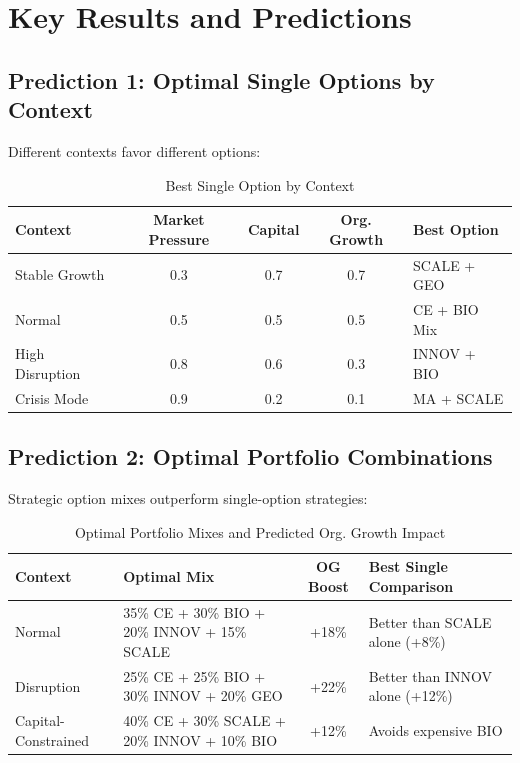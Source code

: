 \section{Key Results and Predictions}
\label{sec:socm-results}

\subsection{Prediction 1: Optimal Single Options by Context}

Different contexts favor different options:

\begin{table}[htbp]
\centering
\caption{Best Single Option by Context}
\label{tab:socm-pred1}
\renewcommand{\arraystretch}{1.3}
\begin{tabular}{@{}lcccl@{}}
\toprule
\textbf{Context} & \textbf{Market Pressure} & \textbf{Capital} & \textbf{Org. Growth} & \textbf{Best Option} \\
\midrule
Stable Growth & 0.3 & 0.7 & 0.7 & SCALE + GEO \\
Normal & 0.5 & 0.5 & 0.5 & CE + BIO Mix \\
High Disruption & 0.8 & 0.6 & 0.3 & INNOV + BIO \\
Crisis Mode & 0.9 & 0.2 & 0.1 & MA + SCALE \\
\bottomrule
\end{tabular}
\end{table}

\subsection{Prediction 2: Optimal Portfolio Combinations}

Strategic option mixes outperform single-option strategies:

\begin{table}[htbp]
\centering
\caption{Optimal Portfolio Mixes and Predicted Org. Growth Impact}
\label{tab:socm-pred2}
\renewcommand{\arraystretch}{1.3}
\begin{tabular}{@{}llcl@{}}
\toprule
\textbf{Context} & \textbf{Optimal Mix} & \textbf{OG Boost} & \textbf{Best Single Comparison} \\
\midrule
Normal & 35\% CE + 30\% BIO + 20\% INNOV + 15\% SCALE & +18\% & Better than SCALE alone (+8\%) \\
Disruption & 25\% CE + 25\% BIO + 30\% INNOV + 20\% GEO & +22\% & Better than INNOV alone (+12\%) \\
Capital-Constrained & 40\% CE + 30\% SCALE + 20\% INNOV + 10\% BIO & +12\% & Avoids expensive BIO \\
\bottomrule
\end{tabular}
\end{table}

